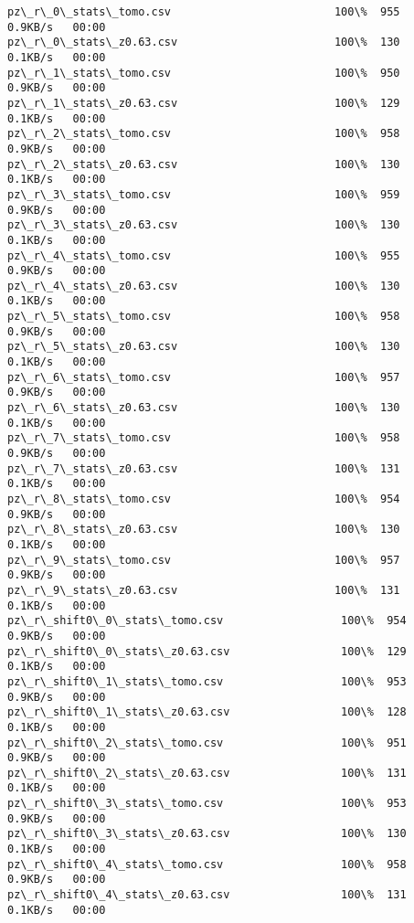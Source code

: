 \documentclass[11pt]{article}
\begin{document}
    \begin{Verbatim}[commandchars=\\\{\}]
pz\_r\_0\_stats\_tomo.csv                         100\%  955     0.9KB/s   00:00    
pz\_r\_0\_stats\_z0.63.csv                        100\%  130     0.1KB/s   00:00    
pz\_r\_1\_stats\_tomo.csv                         100\%  950     0.9KB/s   00:00    
pz\_r\_1\_stats\_z0.63.csv                        100\%  129     0.1KB/s   00:00    
pz\_r\_2\_stats\_tomo.csv                         100\%  958     0.9KB/s   00:00    
pz\_r\_2\_stats\_z0.63.csv                        100\%  130     0.1KB/s   00:00    
pz\_r\_3\_stats\_tomo.csv                         100\%  959     0.9KB/s   00:00    
pz\_r\_3\_stats\_z0.63.csv                        100\%  130     0.1KB/s   00:00    
pz\_r\_4\_stats\_tomo.csv                         100\%  955     0.9KB/s   00:00    
pz\_r\_4\_stats\_z0.63.csv                        100\%  130     0.1KB/s   00:00    
pz\_r\_5\_stats\_tomo.csv                         100\%  958     0.9KB/s   00:00    
pz\_r\_5\_stats\_z0.63.csv                        100\%  130     0.1KB/s   00:00    
pz\_r\_6\_stats\_tomo.csv                         100\%  957     0.9KB/s   00:00    
pz\_r\_6\_stats\_z0.63.csv                        100\%  130     0.1KB/s   00:00    
pz\_r\_7\_stats\_tomo.csv                         100\%  958     0.9KB/s   00:00    
pz\_r\_7\_stats\_z0.63.csv                        100\%  131     0.1KB/s   00:00    
pz\_r\_8\_stats\_tomo.csv                         100\%  954     0.9KB/s   00:00    
pz\_r\_8\_stats\_z0.63.csv                        100\%  130     0.1KB/s   00:00    
pz\_r\_9\_stats\_tomo.csv                         100\%  957     0.9KB/s   00:00    
pz\_r\_9\_stats\_z0.63.csv                        100\%  131     0.1KB/s   00:00    
pz\_r\_shift0\_0\_stats\_tomo.csv                  100\%  954     0.9KB/s   00:00    
pz\_r\_shift0\_0\_stats\_z0.63.csv                 100\%  129     0.1KB/s   00:00    
pz\_r\_shift0\_1\_stats\_tomo.csv                  100\%  953     0.9KB/s   00:00    
pz\_r\_shift0\_1\_stats\_z0.63.csv                 100\%  128     0.1KB/s   00:00    
pz\_r\_shift0\_2\_stats\_tomo.csv                  100\%  951     0.9KB/s   00:00    
pz\_r\_shift0\_2\_stats\_z0.63.csv                 100\%  131     0.1KB/s   00:00    
pz\_r\_shift0\_3\_stats\_tomo.csv                  100\%  953     0.9KB/s   00:00    
pz\_r\_shift0\_3\_stats\_z0.63.csv                 100\%  130     0.1KB/s   00:00    
pz\_r\_shift0\_4\_stats\_tomo.csv                  100\%  958     0.9KB/s   00:00    
pz\_r\_shift0\_4\_stats\_z0.63.csv                 100\%  131     0.1KB/s   00:00    

\end{Verbatim}
\end{document}
